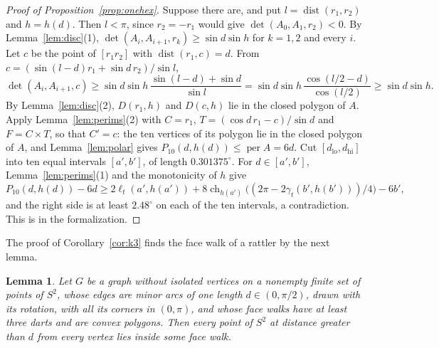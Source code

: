 \documentclass[12pt]{amsart}
\newtheorem{lemma}[theorem]{Lemma}
\theoremstyle{definition}
\theoremstyle{plain}
\theoremstyle{definition}
\newcommand{\Sph}{S^2}
\newcommand{\dist}{\operatorname{dist}}
\newcommand{\per}{\operatorname{per}}
\newcommand{\dlo}{d_{\mathrm{lo}}}
\newcommand{\dhi}{d_{\mathrm{hi}}}
\newcommand{\leanmap}[1]{\ignorespaces}
\begin{document}
\begin{proof}[Proof of Proposition~\ref{prop:onehex}]
Suppose there are, and put $l=\dist(r_1,r_2)$ and $h=h(d)$. Then $l<\pi$, since $r_2=-r_1$ would give $\det(A_0,A_1,r_2)<0$. By Lemma~\ref{lem:disc}(1), $\det(A_i,A_{i+1},r_k)\ge\sin d\sin h$ for $k=1,2$ and every $i$. Let $c$ be the point of $[r_1r_2]$ with $\dist(r_1,c)=d$. From $c=(\sin(l-d)r_1+\sin d\,r_2)/\sin l$,
\[
\det(A_i,A_{i+1},c)\ge\sin d\sin h\,\frac{\sin(l-d)+\sin d}{\sin l}=\sin d\sin h\,\frac{\cos(l/2-d)}{\cos(l/2)}\ge\sin d\sin h .
\]
By Lemma~\ref{lem:disc}(2), $D(r_1,h)$ and $D(c,h)$ lie in the closed polygon of $A$. Apply Lemma~\ref{lem:perims}(2) with $C=r_1$, $T=(\cos d\,r_1-c)/\sin d$ and $F=C\times T$, so that $C'=c$: the ten vertices of its polygon lie in the closed polygon of $A$, and Lemma~\ref{lem:polar} gives $P_{10}(d,h(d))\le\per A=6d$. Cut $[\dlo,\dhi]$ into ten equal intervals $[a',b']$, of length $0.301375^\circ$. For $d\in[a',b']$, Lemma~\ref{lem:perims}(1) and the monotonicity of $h$ give
\[
P_{10}(d,h(d))-6d\ge2\ell_t(a',h(a'))+8\operatorname{ch}_{h(a')}\bigl((2\pi-2\gamma_t(b',h(b')))/4\bigr)-6b',
\]
and the right side is at least $2.48^\circ$ on each of the ten intervals, a contradiction. This is  in the formalization.
\end{proof}

The proof of Corollary~\ref{cor:k3} finds the face walk of a rattler by the next lemma.

\begin{lemma}\label{lem:inside}\leanmap{Tammes15.Geom.exists_face_inside}
Let $G$ be a graph without isolated vertices on a nonempty finite set of points of $\Sph$, whose edges are minor arcs of one length $d\in(0,\pi/2)$, drawn with its rotation, with all its corners in $(0,\pi)$, and whose face walks have at least three darts and are convex polygons. Then every point of $\Sph$ at distance greater than $d$ from every vertex lies inside some face walk.
\end{lemma}
\end{document}

